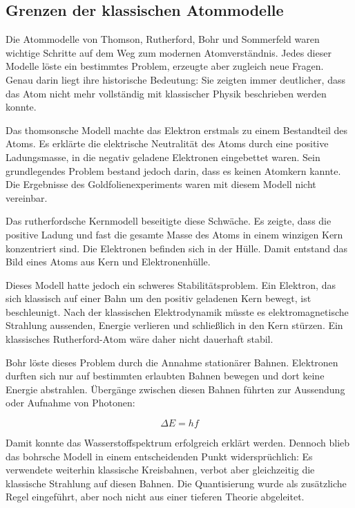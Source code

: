 
\subsection{Grenzen der klassischen Atommodelle}

Die Atommodelle von Thomson, Rutherford, Bohr und Sommerfeld waren wichtige
Schritte auf dem Weg zum modernen Atomverständnis. Jedes dieser Modelle löste
ein bestimmtes Problem, erzeugte aber zugleich neue Fragen. Genau darin liegt
ihre historische Bedeutung: Sie zeigten immer deutlicher, dass das Atom nicht
mehr vollständig mit klassischer Physik beschrieben werden konnte.

Das thomsonsche Modell machte das Elektron erstmals zu einem Bestandteil des
Atoms. Es erklärte die elektrische Neutralität des Atoms durch eine positive
Ladungsmasse, in die negativ geladene Elektronen eingebettet waren. Sein
grundlegendes Problem bestand jedoch darin, dass es keinen Atomkern kannte.
Die Ergebnisse des Goldfolienexperiments waren mit diesem Modell nicht
vereinbar.

Das rutherfordsche Kernmodell beseitigte diese Schwäche. Es zeigte, dass die
positive Ladung und fast die gesamte Masse des Atoms in einem winzigen Kern
konzentriert sind. Die Elektronen befinden sich in der Hülle. Damit entstand
das Bild eines Atoms aus Kern und Elektronenhülle.

Dieses Modell hatte jedoch ein schweres Stabilitätsproblem. Ein Elektron, das
sich klassisch auf einer Bahn um den positiv geladenen Kern bewegt, ist
beschleunigt. Nach der klassischen Elektrodynamik müsste es elektromagnetische
Strahlung aussenden, Energie verlieren und schließlich in den Kern stürzen.
Ein klassisches Rutherford-Atom wäre daher nicht dauerhaft stabil.

Bohr löste dieses Problem durch die Annahme stationärer Bahnen. Elektronen
durften sich nur auf bestimmten erlaubten Bahnen bewegen und dort keine Energie
abstrahlen. Übergänge zwischen diesen Bahnen führten zur Aussendung oder
Aufnahme von Photonen:

\[
\Delta E = h f
\]

Damit konnte das Wasserstoffspektrum erfolgreich erklärt werden. Dennoch blieb
das bohrsche Modell in einem entscheidenden Punkt widersprüchlich: Es verwendete
weiterhin klassische Kreisbahnen, verbot aber gleichzeitig die klassische
Strahlung auf diesen Bahnen. Die Quantisierung wurde als zusätzliche Regel
eingeführt, aber noch nicht aus einer tieferen Theorie abgeleitet.

